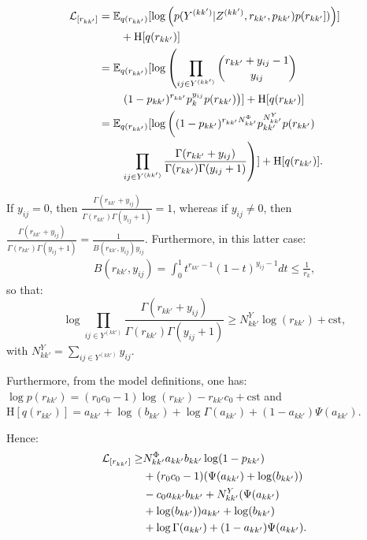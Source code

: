 \small{
\begin{align*}
\mathcal{L}_{[r_{kk'}]} &= \mathbb{E}_{q(r_{kk'})}[\log \left( p(Y^{(kk')}|Z^{(kk')}, r_{kk'}, p_{kk'}) p(r_{kk'}]) \right)] \\
	& \qquad + \textrm{H}[q(r_{kk'})] \\
    &= \mathbb{E}_{q(r_{kk'})}[\log \left( \prod_{ij\in Y^{(kk')}} \dbinom{r_{kk'} + y_{ij}-1}{y_{ij}} \right. \\
    & \qquad  \left. (1-p_{kk'})^{r_{kk'}} p_k^{y_{ij}} p(r_{kk'}) \right) ] + \textrm{H}[q(r_{kk'})] \\
    &= \mathbb{E}_{q(r_{kk'})}[\log \left( (1-p_{kk'})^{r_{kk'} N^{\Phi}_{kk'}} p_{kk'}^{N^{Y}_{kk'}} p(r_{kk'}) \right. \\
    &  \qquad  \left. \prod_{ij\in Y^{(kk')}} \frac{\Gamma(r_{kk'}+y_{ij})}{\Gamma(r_{kk'}) \Gamma(y_{ij}+1) }  \right) ] + \textrm{H}[q(r_{kk'})].
\end{align*}
}

\normalsize

If $y_{ij} = 0$, then $\frac{\Gamma(r_{kk'}+y_{ij})}{\Gamma(r_{kk'}) \Gamma(y_{ij}+1)} = 1$, whereas if $y_{ij} \ne 0$, then $\frac{\Gamma(r_{kk'}+y_{ij})}{\Gamma(r_{kk'}) \Gamma(y_{ij}+1)} = \frac{1}{B(r_{kk'}, y_{ij})y_{ij}}$. Furthermore, in this latter case:
%
\begin{align*}
B(r_{kk'}, y_{ij}) = \int_0^1 t^{r_{kk'}-1} (1-t)^{y_{ij}-1} dt  \leq \frac{1}{r_k},
\end{align*}
%
so that:
%
\begin{equation*}
\log \prod_{ij\in Y^{(kk')}} \frac{\Gamma(r_{kk'}+y_{ij})}{\Gamma(r_{kk'}) \Gamma(y_{ij}+1) } \geq N^Y_{kk'} \log(r_{kk'}) + \mathrm{cst},
\end{equation*}
%
with $N^Y_{kk'} = \sum_{ij\in Y^{(kk')}} y_{ij}$.

Furthermore, from the model definitions, one has: $\log p(r_{kk'}) = (r_0 c_0-1)\log(r_{kk'}) - r_{kk'} c_0 + \mathrm{cst}$  and $\textrm{H}[q(r_{kk'})] = a_{kk'} + \log(b_{kk'}) +\log \Gamma(a_{kk'}) + (1-a_{kk'})\Psi(a_{kk'})$.

Hence:
%
\begin{align*}
\mathcal{L}_{[r_{kk'}]} \geq & N^\Phi_{kk'} a_{kk'} b_{kk'} \log(1-p_{kk'}) \\
& + (r_0 c_0-1 )(\Psi(a_{kk'}) + \log(b_{kk'})) \\
& - c_0 a_{kk'} b_{kk'} + N^Y_{kk'} (\Psi(a_{kk'}) \\
& + \log(b_{kk'}))  a_{kk'} + \log(b_{kk'}) \\
& + \log \Gamma(a_{kk'}) + (1-a_{kk'})\Psi(a_{kk'}).
\end{align*}

